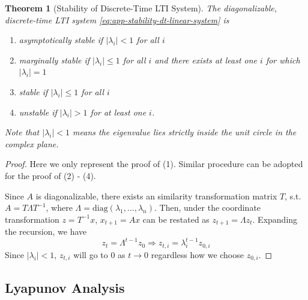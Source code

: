 \documentclass[
]{book}
\newtheorem{theorem}{Theorem}[chapter]
\theoremstyle{definition}
\theoremstyle{definition}
\theoremstyle{definition}
\theoremstyle{definition}
\theoremstyle{remark}
\begin{document}
\begin{theorem}[Stability of Discrete-Time LTI System]
\protect\hypertarget{thm:dtltisystemstability}{}\label{thm:dtltisystemstability}The diagonalizable, discrete-time LTI system \eqref{eq:app-stability-dt-linear-system} is

\begin{enumerate}
\def\labelenumi{\arabic{enumi}.}
\item
  asymptotically stable if \(|\lambda_i| < 1\) for all \(i\)
\item
  marginally stable if \(|\lambda_i| \leq 1\) for all \(i\) and there exists at least one \(i\) for which \(|\lambda_i| = 1\)
\item
  stable if \(|\lambda_i| \leq 1\) for all \(i\)
\item
  unstable if \(|\lambda_i| > 1\) for at least one \(i\).
\end{enumerate}

Note that \(|\lambda_i| < 1\) means the eigenvalue lies strictly inside the unit circle in the complex plane.
\end{theorem}

\begin{proof}
Here we only represent the proof of (1). Similar procedure can be adopted for the proof of (2) - (4).

Since \(A\) is diagonalizable, there exists an similarity transformation matrix \(T\), s.t. \(A = T \Lambda T^{-1}\), where \(\Lambda = \text{diag}(\lambda_1, \dots, \lambda_n)\). Then, under the coordinate transformation \(z = T^{-1} x\), \(x_{t+1} = Ax\) can be restated as \(z_{t+1} = \Lambda z_t\). Expanding the recursion, we have
\begin{equation*}
   z_{t} = \Lambda^{t-1} z_0 \Longrightarrow
   z_{t,i} = \lambda_i^{t-1} z_{0,i}
\end{equation*}
Since \(|\lambda_i| < 1\), \(z_{t,i}\) will go to \(0\) as \(t \rightarrow 0\) regardless how we choose \(z_{0,i}\).
\end{proof}

\subsection{Lyapunov Analysis}\label{lyapunov-analysis}
\end{document}
